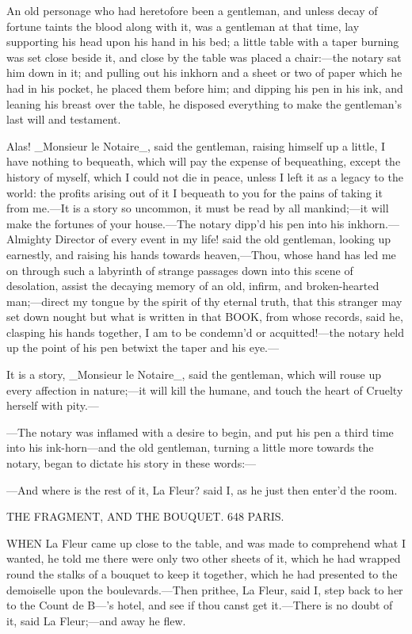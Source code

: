 \documentclass[twoside]{article}
\begin{document}
An old personage who had heretofore been a gentleman, and unless decay of
fortune taints the blood along with it, was a gentleman at that time, lay
supporting his head upon his hand in his bed; a little table with a taper
burning was set close beside it, and close by the table was placed a
chair:—the notary sat him down in it; and pulling out his inkhorn and a
sheet or two of paper which he had in his pocket, he placed them before
him; and dipping his pen in his ink, and leaning his breast over the
table, he disposed everything to make the gentleman’s last will and
testament.

Alas!  _Monsieur le Notaire_, said the gentleman, raising himself up a
little, I have nothing to bequeath, which will pay the expense of
bequeathing, except the history of myself, which I could not die in
peace, unless I left it as a legacy to the world: the profits arising out
of it I bequeath to you for the pains of taking it from me.—It is a story
so uncommon, it must be read by all mankind;—it will make the fortunes of
your house.—The notary dipp’d his pen into his inkhorn.—Almighty Director
of every event in my life! said the old gentleman, looking up earnestly,
and raising his hands towards heaven,—Thou, whose hand has led me on
through such a labyrinth of strange passages down into this scene of
desolation, assist the decaying memory of an old, infirm, and
broken-hearted man;—direct my tongue by the spirit of thy eternal truth,
that this stranger may set down nought but what is written in that BOOK,
from whose records, said he, clasping his hands together, I am to be
condemn’d or acquitted!—the notary held up the point of his pen betwixt
the taper and his eye.—

It is a story, _Monsieur le Notaire_, said the gentleman, which will
rouse up every affection in nature;—it will kill the humane, and touch
the heart of Cruelty herself with pity.—

—The notary was inflamed with a desire to begin, and put his pen a third
time into his ink-horn—and the old gentleman, turning a little more
towards the notary, began to dictate his story in these words:—

—And where is the rest of it, La Fleur? said I, as he just then enter’d
the room.




THE FRAGMENT, AND THE BOUQUET. {648}
PARIS.


WHEN La Fleur came up close to the table, and was made to comprehend what
I wanted, he told me there were only two other sheets of it, which he had
wrapped round the stalks of a bouquet to keep it together, which he had
presented to the demoiselle upon the boulevards.—Then prithee, La Fleur,
said I, step back to her to the Count de B—’s hotel, and see if thou
canst get it.—There is no doubt of it, said La Fleur;—and away he flew.
\end{document}
